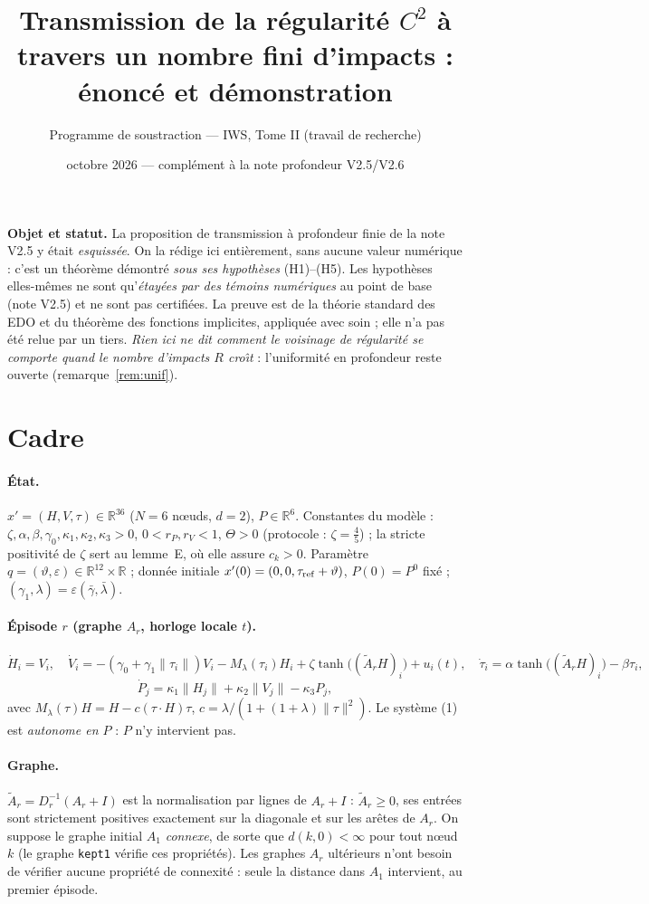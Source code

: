 \documentclass[11pt,a4paper]{article}
\title{Transmission de la r\'egularit\'e $C^2$ \`a travers un nombre fini d'impacts :\\ \'enonc\'e et d\'emonstration}
\author{Programme de soustraction --- IWS, Tome II (travail de recherche)}
\date{octobre 2026 --- compl\'ement \`a la note \og profondeur \fg{} V2.5/V2.6}
\theoremstyle{remark}
\newcommand{\R}{\mathbb R}
\newcommand{\norm}[1]{\lVert #1\rVert}
\newcommand{\vth}{\vartheta}
\begin{document}
\maketitle

\noindent\textbf{Objet et statut.} La proposition de transmission \`a profondeur finie de la note V2.5 y \'etait \emph{esquiss\'ee}. On la r\'edige ici enti\`erement, sans aucune valeur num\'erique : c'est un th\'eor\`eme d\'emontr\'e \emph{sous ses hypoth\`eses} (H1)--(H5). Les hypoth\`eses elles-m\^emes ne sont qu'\emph{\'etay\'ees par des t\'emoins num\'eriques} au point de base (note V2.5) et ne sont pas certifi\'ees. La preuve est de la th\'eorie standard des EDO et du th\'eor\`eme des fonctions implicites, appliqu\'ee avec soin ; elle n'a pas \'et\'e relue par un tiers. \emph{Rien ici ne dit comment le voisinage de r\'egularit\'e se comporte quand le nombre d'impacts $R$ cro\^{\i}t} : l'uniformit\'e en profondeur reste ouverte (remarque~\ref{rem:unif}).

\section{Cadre}
\paragraph{\'Etat.} $x'=(H,V,\tau)\in\R^{36}$ ($N=6$ n\oe uds, $d=2$), $P\in\R^6$. Constantes du mod\`ele : $\zeta,\alpha,\beta,\gamma_0,\kappa_1,\kappa_2,\kappa_3>0$, $0<r_P,r_V<1$, $\Theta>0$ (protocole : $\zeta=\frac45$) ; la stricte positivit\'e de $\zeta$ sert au lemme~E, o\`u elle assure $c_k>0$. Param\`etre $q=(\vth,\varepsilon)\in\R^{12}\times\R$ ; donn\'ee initiale $x'(0)=(0,0,\tau_{\rm ref}+\vth)$, $P(0)=P^0$ fix\'e ; $(\gamma_1,\lambda)=\varepsilon(\bar\gamma,\bar\lambda)$.

\paragraph{\'Episode $r$ (graphe $A_r$, horloge locale $t$).}
\[ \dot H_i=V_i,\quad \dot V_i=-(\gamma_0+\gamma_1\norm{\tau_i})V_i-M_\lambda(\tau_i)H_i+\zeta\tanh\bigl((\tilde A_rH)_i\bigr)+u_i(t),\quad \dot\tau_i=\alpha\tanh\bigl((\tilde A_rH)_i\bigr)-\beta\tau_i, \tag{1}\]
\[ \dot P_j=\kappa_1\norm{H_j}+\kappa_2\norm{V_j}-\kappa_3P_j, \tag{2}\]
avec $M_\lambda(\tau)H=H-c(\tau\!\cdot\!H)\tau$, $c=\lambda/(1+(1+\lambda)\norm\tau^2)$. Le syst\`eme (1) est \emph{autonome en $P$} : $P$ n'y intervient pas.

\paragraph{Graphe.} $\tilde A_r=D_r^{-1}(A_r+I)$ est la normalisation par lignes de $A_r+I$ : $\tilde A_r\ge0$, ses entr\'ees sont strictement positives exactement sur la diagonale et sur les ar\^etes de $A_r$. On suppose le graphe initial $A_1$ \emph{connexe}, de sorte que $d(k,0)<\infty$ pour tout n\oe ud $k$ (le graphe \texttt{kept1} v\'erifie ces propri\'et\'es). Les graphes $A_r$ ult\'erieurs n'ont besoin de v\'erifier aucune propri\'et\'e de connexit\'e : seule la distance dans $A_1$ intervient, au premier \'episode.
\end{document}
